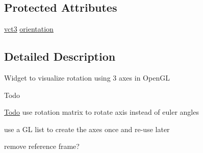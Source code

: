 \subsection*{Protected Attributes}
\begin{DoxyCompactItemize}
\item 
\hyperlink{vct_fixed_size_vector_types_8h_a3af82acdbf4eeb73c551909240b106ea}{vct3} \hyperlink{classvct_qt_widget_rotation_open_g_l_ae9fd2c827d38e62e475257ce91261e20}{orientation}
\end{DoxyCompactItemize}


\subsection{Detailed Description}
Widget to visualize rotation using 3 axes in Open\-G\-L \begin{DoxyRefDesc}{Todo}
\item[\hyperlink{todo__todo000006}{Todo}]use rotation matrix to rotate axis instead of euler angles 

use a G\-L list to create the axes once and re-\/use later 

remove reference frame? \end{DoxyRefDesc}


